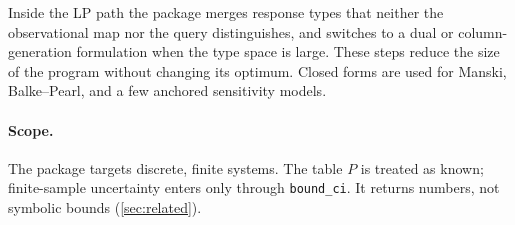 Inside the LP path the package merges response types that neither the observational map nor the query distinguishes, and switches to a dual or column-generation formulation when the type space is large. These steps reduce the size of the program without changing its optimum. Closed forms are used for Manski, Balke--Pearl, and a few anchored sensitivity models.

\paragraph{Scope.} The package targets discrete, finite systems. The table $P$ is treated as known; finite-sample uncertainty enters only through \texttt{bound\_ci}. It returns numbers, not symbolic bounds (\cref{sec:related}).

\clearpage
